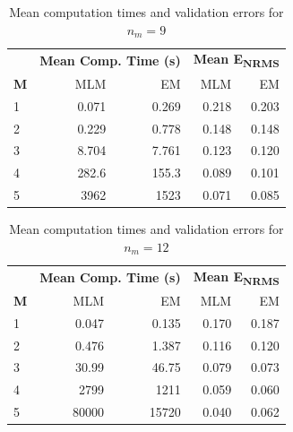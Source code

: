 \renewcommand{\arraystretch}{1.3}
\begin{table}[!h]
\centering
\caption{Mean computation times and validation errors for $n_m = 9$}
\label{Results_nm9}
\begin{tabular}{l||r|r||r|r}
\hline
                & \multicolumn{2}{c||}{\textbf{Mean Comp. Time (s)}} & \multicolumn{2}{c}{\textbf{Mean E\textsubscript{NRMS}}} \\ \cline{2-5} 
\textbf{M} & \hspace{10mm} MLM           & EM            & \hspace{1mm} MLM             & EM            \\ \hline \hline 
1          & 0.071               & 0.269             & 0.218                & 0.203              \\ \hline
2          & 0.229               & 0.778             & 0.148               & 0.148              \\ \hline
3           & 8.704               & 7.761             & 0.123                & 0.120              \\ \hline
4          & 282.6               & 155.3            & 0.089                & 0.101              \\ \hline
5         & 3962              & 1523            & 0.071                & 0.085              \\ \hline
\end{tabular}
\end{table}

\renewcommand{\arraystretch}{1.3}
\begin{table}[!h]
\centering
\caption{Mean computation times and validation errors for $n_m = 12$}
\label{Results_nm12}
\begin{tabular}{l||r|r||r|r}
\hline
                & \multicolumn{2}{c||}{\textbf{Mean Comp. Time (s)}} & \multicolumn{2}{c}{\textbf{Mean E\textsubscript{NRMS}}} \\ \cline{2-5} 
\textbf{M} & \hspace{10mm} MLM           & EM            & \hspace{1mm} MLM             & EM            \\ \hline \hline 
1          & 0.047               & 0.135             & 0.170                & 0.187              \\ \hline
2          & 0.476               & 1.387             & 0.116               & 0.120              \\ \hline
3           & 30.99               & 46.75             & 0.079                & 0.073              \\ \hline
4          & 2799               & 1211            & 0.059                & 0.060              \\ \hline
5         & 80000              & 15720            & 0.040                & 0.062              \\ \hline
\end{tabular}
\end{table}

